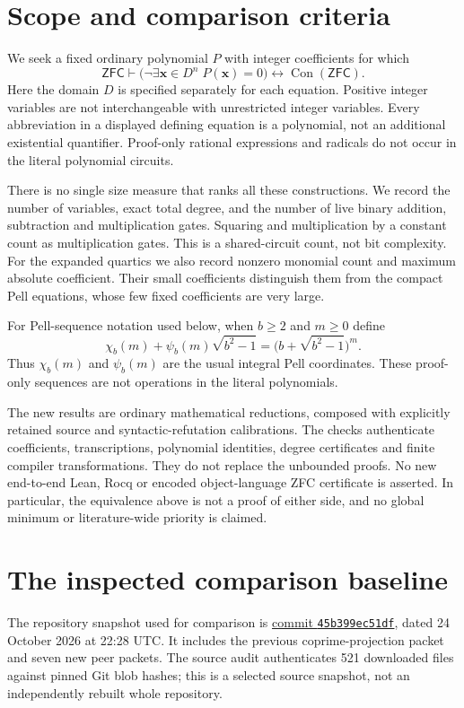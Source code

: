 \section{Scope and comparison criteria}
We seek a fixed ordinary polynomial $P$ with integer coefficients for which
\[
 \mathsf{ZFC}\vdash
 \bigl(\neg\exists\mathbf x\in D^n\;P(\mathbf x)=0\bigr)
 \longleftrightarrow\operatorname{Con}(\mathsf{ZFC}).
\]
Here the domain $D$ is specified separately for each equation. Positive
integer variables are not interchangeable with unrestricted integer
variables. Every abbreviation in a displayed defining equation is a polynomial,
not an additional existential quantifier. Proof-only rational expressions
and radicals do not occur in the literal polynomial circuits.

There is no single size measure that ranks all these constructions. We
record the number of variables, exact total degree, and the number of live
binary addition, subtraction and multiplication gates. Squaring and
multiplication by a constant count as multiplication gates. This is a
shared-circuit count, not bit complexity. For the expanded quartics we
also record nonzero monomial count and maximum absolute coefficient.
Their small coefficients distinguish them from the compact Pell equations,
whose few fixed coefficients are very large.

For Pell-sequence notation used below, when $b\ge2$ and $m\ge0$ define
\[
 \chi_b(m)+\psi_b(m)\sqrt{b^2-1}
   =\bigl(b+\sqrt{b^2-1}\bigr)^m.
\]
Thus $\chi_b(m)$ and $\psi_b(m)$ are the usual integral Pell coordinates.
These proof-only sequences are not operations in the literal polynomials.

The new results are ordinary mathematical reductions, composed with
explicitly retained source and syntactic-refutation calibrations. The
checks authenticate coefficients, transcriptions, polynomial identities,
degree certificates and finite compiler transformations. They do not
replace the unbounded proofs. No new end-to-end Lean, Rocq or encoded
object-language ZFC certificate is asserted. In particular, the
equivalence above is not a proof of either side, and no global minimum
or literature-wide priority is claimed.

\section{The inspected comparison baseline}
The repository snapshot used for comparison is
\href{https://github.com/VladimirReshetnikov/ProveIt/tree/45b399ec51dfbecb891dd51d8a9e4b6b7c361ac6}{commit
\texttt{45b399ec51df}}, dated 24 October 2026 at 22:28 UTC. It includes the
previous coprime-projection packet and seven new peer packets. The source
audit authenticates 521 downloaded files against pinned Git blob hashes;
this is a selected source snapshot, not an independently rebuilt whole
repository.

